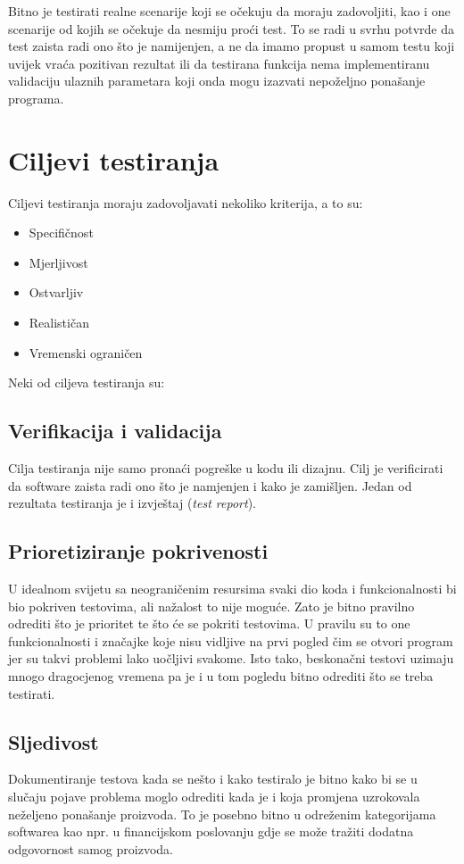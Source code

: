 Bitno je testirati realne scenarije koji se očekuju da moraju zadovoljiti,  kao i one scenarije od kojih se očekuje da nesmiju proći test.
To se radi u svrhu potvrde da test zaista radi ono što je namijenjen,  a ne da imamo propust u samom testu koji uvijek vraća pozitivan rezultat ili da testirana funkcija nema implementiranu validaciju ulaznih parametara koji onda mogu izazvati nepoželjno ponašanje programa.

\section{Ciljevi testiranja}
Ciljevi testiranja moraju zadovoljavati nekoliko kriterija, a to su:
\begin{itemize}
\item Specifičnost
\item Mjerljivost
\item Ostvarljiv
\item Realističan
\item Vremenski ograničen
\end{itemize}

Neki od ciljeva testiranja su: \cite{quadri2010software}
\subsection*{Verifikacija i validacija}
Cilja testiranja nije samo pronaći pogreške u kodu ili dizajnu.  
Cilj je verificirati da software zaista radi ono što je namjenjen i kako je zamišljen.
Jedan od rezultata testiranja je i izvještaj (\textit{test report}).

\subsection*{Prioretiziranje pokrivenosti}
U idealnom svijetu sa neograničenim resursima svaki dio koda i funkcionalnosti bi bio pokriven testovima, ali nažalost to nije moguće.
Zato je bitno pravilno odrediti što je prioritet te što će se pokriti testovima. 
U pravilu su to one funkcionalnosti i značajke koje nisu vidljive na prvi pogled čim se otvori program jer su takvi problemi lako uočljivi svakome.
Isto tako, beskonačni testovi uzimaju mnogo dragocjenog vremena pa je i u tom pogledu bitno odrediti što se treba testirati.

\subsection*{Sljedivost}
Dokumentiranje testova kada se nešto i kako testiralo je bitno kako bi se u slučaju pojave problema moglo odrediti kada je i koja promjena uzrokovala neželjeno ponašanje proizvoda.
To je posebno bitno u odreženim kategorijama softwarea kao npr. u financijskom poslovanju gdje se može tražiti dodatna odgovornost samog proizvoda.

